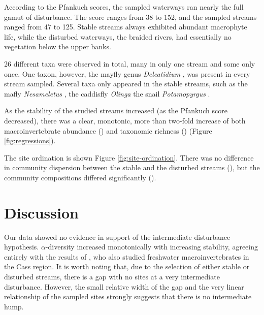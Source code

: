\documentclass[a4paper,10pt]{article}
\newcommand\inputresults[1]{\unskip}
\newcommand\spbinom[1]{%
	\emph{#1}%
}
\begin{document}
According to the Pfankuch scores, the sampled waterways ran nearly the full gamut of disturbance.
The score ranges from 38 to 152, and the sampled streams ranged from 47 to 125.
Stable streams always exhibited abundant macrophyte life, while the disturbed waterways, the braided rivers, had essentially no vegetation below the upper banks.

26 different taxa were observed in total, many in only one stream and some only once.
One taxon, however, the mayfly genus \spbinom{Deleatidium}, was present in every stream sampled.
Several taxa only appeared in the stable streams, such as the mafly \spbinom{Nesameletus}, the caddisfly \spbinom{Olinga} the snail \spbinom{Potamopyrgus}.


As the stability of the studied streams increased (as the Pfankuch score decreased), there was a clear, monotonic, more than two-fold increase of both macroinvertebrate abundance (\inputresults{abundance-regression}) and taxonomic richness (\inputresults{richness-regression}) (Figure \ref{fig:regressions}).

The site ordination is shown Figure \ref{fig:site-ordination}.
There was no difference in community dispersion between the stable and the disturbed streams (\inputresults{permdisp}), but the community compositions differed significantly (\inputresults{permanova}).


\section*{Discussion}

Our data showed no evidence in support of the intermediate disturbance hypothesis.
$\alpha$-diversity increased monotonically with increasing stability, agreeing entirely with the results of \textcite{diversity-stability-canterbury}, who also studied freshwater macroinvertebrates in the Cass region.
It is worth noting that, due to the selection of either stable or disturbed streams, there is a gap with no sites at a very intermediate disturbance.
However, the small relative width of the gap and the very linear relationship of the sampled sites strongly suggests that there is no intermediate hump.
\end{document}
